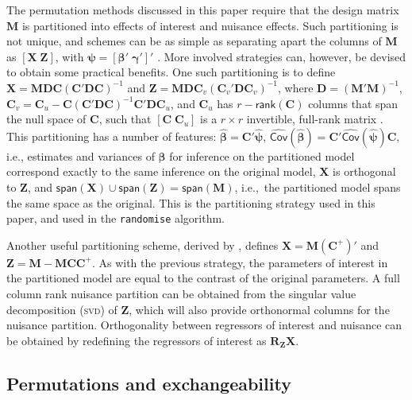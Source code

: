 The permutation methods discussed in this paper require that the design matrix $\mathbf{M}$ is partitioned into effects of interest and nuisance effects. Such partitioning is not unique, and schemes can be as simple as separating apart the columns of $\mathbf{M}$ as $\left[ \mathbf{X} \; \mathbf{Z} \right]$, with $\boldsymbol{\psi} = \left[ \boldsymbol{\beta}' \; \boldsymbol{\gamma}' \right]'$ \citep{Guttman1982}. More involved strategies can, however, be devised to obtain some practical benefits. One such partitioning is to define $\mathbf{X} = \mathbf{M} \mathbf{D} \mathbf{C} \left(\mathbf{C}'\mathbf{D}\mathbf{C}\right)^{-1}$ and 
$\mathbf{Z} = \mathbf{M} \mathbf{D} \mathbf{C}_v \left(\mathbf{C}_v'\mathbf{D}\mathbf{C}_v\right)^{-1}$, where $\mathbf{D}=(\mathbf{M}'\mathbf{M})^{-1}$, $\mathbf{C}_v=\mathbf{C}_u-\mathbf{C}(\mathbf{C}'\mathbf{D}\mathbf{C})^{-1}\mathbf{C}'\mathbf{D}\mathbf{C}_u$, and $\mathbf{C}_u$ has $r-\mathsf{rank}\left(\mathbf{C}\right)$ columns that span the null space of $\mathbf{C}$, such that $[\mathbf{C} \; \mathbf{C}_u]$ is a $r \times r$ invertible, full-rank matrix \citep{Beckmann2001, Smith2007}. This partitioning has a number of features: $\boldsymbol{\hat{\beta}} = \mathbf{C}'\boldsymbol{\hat{\psi}}$, $\widehat{\mathsf{Cov}}(\boldsymbol{\hat{\beta}}) = \mathbf{C}'\widehat{\mathsf{Cov}}(\boldsymbol{\hat{\psi}})\mathbf{C}$, i.e., estimates and variances of $\boldsymbol{\beta}$ for inference on the partitioned model correspond exactly to the same inference on the original model, $\mathbf{X}$ is orthogonal to $\mathbf{Z}$, and $\mathsf{span}(\mathbf{X}) \cup \mathsf{span}(\mathbf{Z}) = \mathsf{span}(\mathbf{M})$, i.e.,\ the partitioned model spans the same space as the original. This is the partitioning strategy used in this paper, and used in the \texttt{randomise} algorithm.

Another useful partitioning scheme, derived by \citet{Ridgway2009}, defines $\mathbf{X}=\mathbf{M}(\mathbf{C}^+)'$ and $\mathbf{Z}=\mathbf{M}-\mathbf{M}\mathbf{C}\mathbf{C}^{+}$. As with the previous strategy, the parameters of interest in the partitioned model are equal to the contrast of the original parameters. A full column rank nuisance partition can be obtained from the singular value decomposition (\textsc{svd}) of $\mathbf{Z}$, which will also provide orthonormal columns for the nuisance partition. Orthogonality between regressors of interest and nuisance can be obtained by redefining the regressors of interest as  $\mathbf{R}_{\mathbf{Z}}\mathbf{X}$.

\subsection{Permutations and exchangeability}


